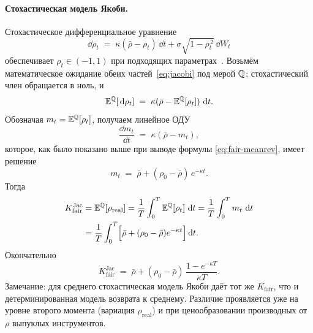 \paragraph{Стохастическая модель Якоби.}
Стохастическое дифференциальное уравнение
\begin{equation}
\label{eq:jacobi}
  \dd\rho_t \;=\; \kappa(\bar\rho-\rho_t)\,\dd t
                + \sigma\sqrt{1-\rho_t^{\,2}}\,\dd W_t
\end{equation}
обеспечивает $\rho_t \in (-1,1)$ при подходящих
параметрах~\cite{ahdida2013jacobi}. Возьмём математическое ожидание
обеих частей~\eqref{eq:jacobi} под мерой $\mathbb{Q}$; стохастический член
обращается в ноль, и
\[
  \mathbb{E}^{\mathbb{Q}}[\,\mathrm{d}\rho_t] \;=\; \kappa(\bar\rho - \mathbb{E}^{\mathbb{Q}}[\rho_t])\,\,\mathrm{d} t.
\]
Обозначая $m_t = \mathbb{E}^{\mathbb{Q}}[\rho_t]$, получаем линейное ОДУ
\[
  \frac{\dd m_t}{\dd t} \;=\; \kappa(\bar\rho - m_t),
\]
которое, как было показано выше при выводе формулы
\eqref{eq:fair-meanrev}, имеет решение
\[
  m_t \;=\; \bar\rho + (\rho_0 - \bar\rho)\,e^{-\kappa t}.
\]
Тогда
\begin{align*}
  K_{\text{fair}}^{\text{Jac}}
  &= \mathbb{E}^{\mathbb{Q}}[\rho_{\text{real}}]
   = \frac{1}{T}\int_{0}^{T} \mathbb{E}^{\mathbb{Q}}[\rho_t]\,\,\mathrm{d} t
   = \frac{1}{T}\int_{0}^{T} m_t\,\,\mathrm{d} t \\
  &= \frac{1}{T}\int_{0}^{T}\Bigl[\bar\rho + (\rho_0-\bar\rho)e^{-\kappa t}\Bigr]\,\mathrm{d} t.
\end{align*}
Окончательно
\begin{equation}
\label{eq:fair-jacobi}
  \boxed{\;K_{\text{fair}}^{\text{Jac}}
  \;=\; \bar\rho + (\rho_0-\bar\rho)\,\frac{1-e^{-\kappa T}}{\kappa T}.\;}
\end{equation}
Замечание: для среднего стохастическая модель Якоби даёт тот же
$K_{\text{fair}}$, что и детерминированная модель возврата к среднему.
Различие проявляется уже на уровне второго момента (вариация
$\rho_{\text{real}}$) и при ценообразовании производных от $\rho$
выпуклых инструментов.


